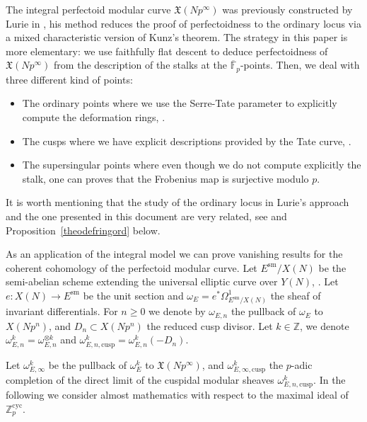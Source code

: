 \documentclass[JEP,XML,SOM,Unicode,published]{cedram}
\newcommand{\cusp}{\mathrm{cusp}}
\newcommand{\cyc}{\mathrm{cyc}}
\newcommand{\sm}{\mathrm{sm}}
\numberwithin{equation}{section}
\theoremstyle{definition}
\newcommand{\bb}[1]{\mathbb{#1}}
\newcommand{\f}[1]{\mathfrak{#1}}
\begin{document}
The integral perfectoid modular curve $\f{X}(Np^\infty)$ was previously constructed by Lurie in \cite{JacobFullLevel2019}, his method reduces the proof of perfectoidness to the ordinary locus via a mixed characteristic version of Kunz's theorem. The strategy in this paper is more elementary: we use faithfully flat descent to deduce perfectoidness of $\f{X}(Np^\infty)$ from the description of the stalks at the $\overline{\bb{F}}_p$-points. Then, we deal with three different kind of points:
\begin{itemize}
\item The ordinary points where we use the Serre-Tate parameter to explicitly compute the deformation rings, \cf \cite[\S 2]{katz1981serre}.
\item The cusps where we have explicit descriptions provided by the Tate curve, \cf \cite[\S 8--10]{katz1985arithmetic}.
\item The supersingular points where even though we do not compute explicitly the stalk, one can proves that the Frobenius map is surjective modulo $p$.
\end{itemize}
It is worth mentioning that the study of the ordinary locus in Lurie's approach and the one presented in this document are very related, see \cite[Prop.\,2.2]{JacobFullLevel2019} and Proposition~\ref{theodefringord} below.

As an application of the integral model we can prove vanishing results for the coherent cohomology of the perfectoid modular curve. Let $E^{\sm}/X(N)$ be the semi-abelian scheme extending the universal elliptic curve over $Y(N)$, \cf \cite{deligne1973schemas}. Let \hbox{$e: X(N)\to E^{\sm}$} be the unit section and $\omega_E= e^* \Omega^1_{E^{\sm}/X(N)}$ the sheaf of invariant differentials. For $n\geq 0$ we denote by $\omega_{E,n}$ the pullback of $\omega_E$ to $X(Np^n)$, and $D_n\subset X(Np^n)$ the reduced cusp divisor. Let $k\in \bb{Z}$, we denote $\omega^{k}_{E,n}= \omega^{\otimes k}_{E,n}$ and $\omega^{k}_{E,n,\cusp}= \omega^k_{E,n}(-D_n)$.

Let $\omega^k_{E,\infty}$ be the pullback of $\omega_E^k$ to $\f{X}(Np^\infty)$, and $\omega^k_{E,\infty, \cusp}$ the $p$-adic completion of the direct limit of the cuspidal modular sheaves $\omega^k_{E,n,\cusp}$. In the following we consider almost mathematics with respect to the maximal ideal of $\bb{Z}_p^{\cyc}$.
\end{document}
